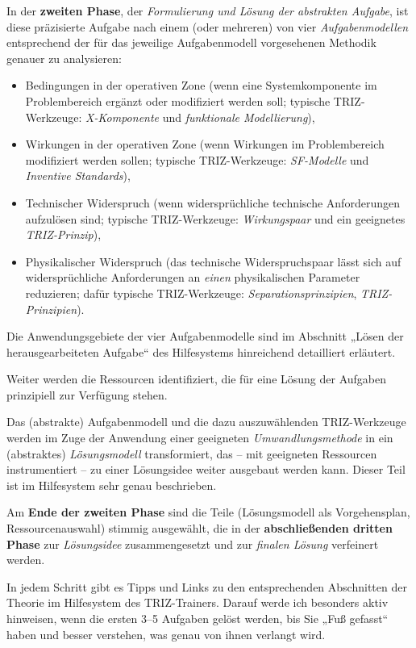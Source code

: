 \documentclass[11pt,a4paper]{article}
\begin{document}
In der \textbf{zweiten Phase}, der \emph{Formulierung und Lösung der
  abstrakten Aufgabe}, ist diese präzisierte Aufgabe nach einem (oder
mehreren) von vier \emph{Aufgabenmodellen} entsprechend der für das jeweilige
Aufgabenmodell vorgesehenen Methodik genauer zu analysieren:
\begin{itemize}[noitemsep]
\item Bedingungen in der operativen Zone (wenn eine Systemkomponente im
  Problembereich ergänzt oder modifiziert werden soll; typische
  TRIZ-Werkzeuge: \emph{X-Komponente} und \emph{funktionale Modellierung}),
\item Wirkungen in der operativen Zone (wenn Wirkungen im Problembereich
  modifiziert werden sollen; typische TRIZ-Werkzeuge: \emph{SF-Modelle} und
  \emph{Inventive Standards}), 
\item Technischer Widerspruch (wenn widersprüchliche technische Anforderungen
  aufzulösen sind; typische TRIZ-Werkzeuge: \emph{Wirkungspaar} und ein
  geeignetes \emph{TRIZ-Prinzip}),
\item Physikalischer Widerspruch (das technische Widerspruchspaar lässt sich
  auf widersprüchliche Anforderungen an \emph{einen} physikalischen Parameter
  reduzieren; dafür typische TRIZ-Werkzeuge: \emph{Separationsprinzipien},
  \emph{TRIZ-Prinzipien}).
\end{itemize}
Die Anwendungsgebiete der vier Aufgabenmodelle sind im Abschnitt „Lösen der
herausgearbeiteten Aufgabe“ des Hilfesystems hinreichend detailliert
erläutert.

Weiter werden die Ressourcen identifiziert, die für eine Lösung der Aufgaben
prinzipiell zur Verfügung stehen.


Das (abstrakte) Aufgabenmodell und die dazu auszuwählenden TRIZ-Werkzeuge
werden im Zuge der Anwendung einer geeigneten \emph{Umwandlungsmethode} in ein
(abstraktes) \emph{Lösungs\-modell} transformiert, das -- mit geeigneten
Ressourcen instrumentiert -- zu einer Lösungsidee weiter ausgebaut werden
kann.  Dieser Teil ist im Hilfesystem sehr genau beschrieben.

Am \textbf{Ende der zweiten Phase} sind die Teile (Lösungsmodell als
Vorgehensplan, Ressourcenauswahl) stimmig ausgewählt, die in der
\textbf{abschließenden dritten Phase} zur \emph{Lösungsidee} zusammengesetzt
und zur \emph{finalen Lösung} verfeinert werden. 

In jedem Schritt gibt es Tipps und Links zu den entsprechenden Abschnitten der
Theorie im Hilfesystem des TRIZ-Trainers.  Darauf werde ich besonders aktiv
hinweisen, wenn die ersten 3--5 Aufgaben gelöst werden, bis Sie „Fuß gefasst“
haben und besser verstehen, was genau von ihnen verlangt wird.
\end{document}
